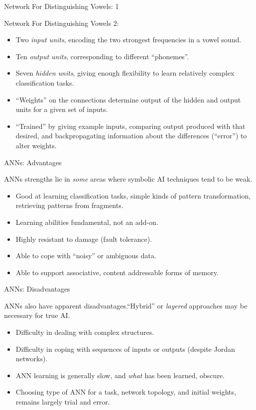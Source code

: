 \documentclass{article}
\begin{document}
\begin{slide}{}
{\Large Network For Distinguishing Vowels: 1}
\begin{center}


\end{center}
\end{slide}

\begin{slide}{}
{\Large Network For Distinguishing Vowels 2:}
\begin{itemize}
\item Two {\em input units}, encoding
the two strongest frequencies in a vowel sound.
\item Ten {\em output units}, corresponding to different
``phonemes''.
\item Seven {\em hidden units}, giving enough
flexibility to learn relatively complex classification tasks.
\item ``Weights'' on the connections determine output of the hidden
and output units for a given set of inputs.
\item ``Trained'' by giving example inputs,
comparing output produced with that desired, and
backpropagating information about the differences (``error'') to
alter weights.
\end{itemize}
\end{slide}

\begin{slide}{}
{\Large ANNs: Advantages}

ANNs strengths lie in {\em some} areas where symbolic AI techniques tend to
be weak.
\begin{itemize}
\item Good at learning classification tasks, simple
kinds of pattern transformation, retrieving patterns from
fragments. 
\item Learning abilities fundamental, not an add-on.
\item Highly resistant to damage (fault tolerance).
\item Able to cope with ``noisy'' or ambiguous data.
\item Able to support associative, content addressable forms of memory.
\end{itemize}
\end{slide}

\begin{slide}{} 
{\Large ANNs: Disadvantages}

ANNs also have apparent disadvantages.``Hybrid'' or {\em layered}
approaches may be necessary for true AI.
\begin{itemize}
\item Difficulty in dealing with complex structures.
\item Difficulty in coping with sequences of inputs or outputs
(despite Jordan networks).
\item ANN learning is generally slow, and {\em what} has been learned, obscure.
\item Choosing type of ANN for a task, network topology, and initial
weights, remains largely trial and error.
\end{itemize}
\end{slide}
\end{document}
